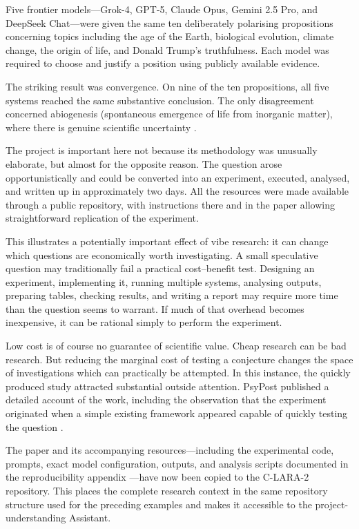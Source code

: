 \documentclass[12pt]{article}
\begin{document}
Five frontier models---Grok-4, GPT-5, Claude Opus, Gemini 2.5 Pro, and DeepSeek Chat---were given the same ten deliberately polarising propositions concerning topics including the age of the Earth, biological evolution, climate change, the origin of life, and Donald Trump's truthfulness. Each model was required to choose and justify a position using publicly available evidence.

The striking result was convergence. On nine of the ten propositions, all five systems reached the same substantive conclusion. The only disagreement concerned abiogenesis (spontaneous emergence of life from inorganic matter), where there is genuine scientific uncertainty \citep[Section~4]{raynerChatGPT2025grok}.

The project is important here not because its methodology was unusually elaborate, but almost for the opposite reason. The question arose opportunistically and could be converted into an experiment, executed, analysed, and written up in approximately two days. All the resources were made available through a public repository, with instructions there and in the paper allowing straightforward replication of the experiment. 

This illustrates a potentially important effect of vibe research: it can change which questions are economically worth investigating. A small speculative question may traditionally fail a practical cost--benefit test. Designing an experiment, implementing it, running multiple systems, analysing outputs, preparing tables, checking results, and writing a report may require more time than the question seems to warrant. If much of that overhead becomes inexpensive, it can be rational simply to perform the experiment.

Low cost is of course no guarantee of scientific value. Cheap research can be bad research. But reducing the marginal cost of testing a conjecture changes the space of investigations which can practically be attempted.
In this instance, the quickly produced study attracted substantial outside attention. PsyPost published a detailed account of the work, including the observation that the experiment originated when a simple existing framework appeared capable of quickly testing the question \citep{dolan2025grok}.

The paper and its accompanying resources---including the experimental code, prompts, exact model configuration, outputs, and analysis scripts documented in the reproducibility appendix \citep[Appendix~A]{raynerChatGPT2025grok}---have now been copied to the C-LARA-2 repository. This places the complete research context in the same repository structure used for the preceding examples and makes it accessible to the project-understanding Assistant.
\end{document}
